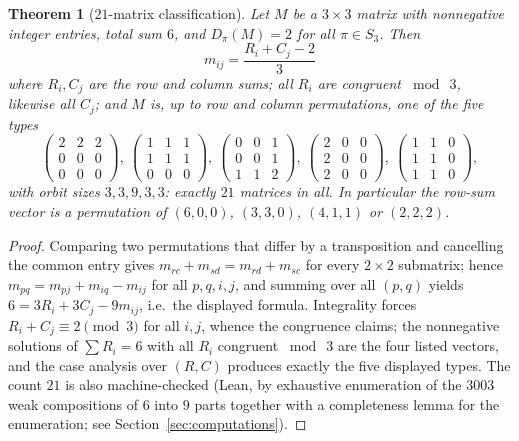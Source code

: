 \documentclass[11pt]{article}
\newtheorem{theorem}{Theorem}[section]
\theoremstyle{remark}
\begin{document}
\begin{theorem}[$21$-matrix classification]\label{thm:cutmatrix}
Let $M$ be a $3\times 3$ matrix with nonnegative integer entries, total sum $6$,
and $D_\pi(M)=2$ for all $\pi\in S_3$. Then
\[
m_{ij}=\frac{R_i+C_j-2}{3}
\]
where $R_i,C_j$ are the row and column sums; all $R_i$ are congruent
$\bmod\ 3$, likewise all $C_j$; and $M$ is, up to row and column permutations, one
of the five types
\[
\begin{pmatrix}2&2&2\\0&0&0\\0&0&0\end{pmatrix},\
\begin{pmatrix}1&1&1\\1&1&1\\0&0&0\end{pmatrix},\
\begin{pmatrix}0&0&1\\0&0&1\\1&1&2\end{pmatrix},\
\begin{pmatrix}2&0&0\\2&0&0\\2&0&0\end{pmatrix},\
\begin{pmatrix}1&1&0\\1&1&0\\1&1&0\end{pmatrix},
\]
with orbit sizes $3,3,9,3,3$: exactly $21$ matrices in all. In particular the
row-sum vector is a permutation of $(6,0,0)$, $(3,3,0)$, $(4,1,1)$ or $(2,2,2)$.
\end{theorem}

\begin{proof}
Comparing two permutations that differ by a transposition and cancelling the
common entry gives $m_{rc}+m_{sd}=m_{rd}+m_{sc}$ for every $2\times 2$ submatrix;
hence $m_{pq}=m_{pj}+m_{iq}-m_{ij}$ for all $p,q,i,j$, and summing over all
$(p,q)$ yields $6=3R_i+3C_j-9m_{ij}$, i.e.\ the displayed formula. Integrality
forces $R_i+C_j\equiv 2 \pmod 3$ for all $i,j$, whence the congruence claims; the
nonnegative solutions of $\sum R_i=6$ with all $R_i$ congruent $\bmod\ 3$ are the
four listed vectors, and the case analysis over $(R,C)$ produces exactly the five
displayed types. The count $21$ is also machine-checked (Lean, by exhaustive
enumeration of the $3003$ weak compositions of $6$ into $9$ parts together with a
completeness lemma for the enumeration; see Section~\ref{sec:computations}).
\end{proof}
\end{document}
